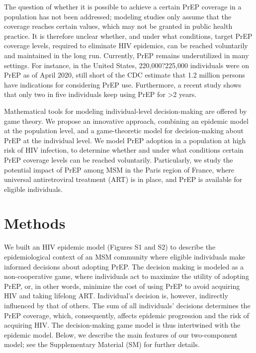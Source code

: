 \documentclass[preprint,review,12pt]{article}			%
\begin{document}
The question of whether it is possible to achieve a certain PrEP coverage in a population has not been addressed; modeling studies only assume that the coverage reaches certain values, which may not be granted in public health practice. It is therefore unclear whether, and under what conditions, target PrEP coverage levels, required to eliminate HIV epidemics, can be reached voluntarily and maintained in the long run. Currently, PrEP remains underutilized in many settings.\cite{Cohen2018} For instance, in the United States, 220,000?225,000 individuals were on PrEP as of April 2020,\cite{PrEPwatch_2019}  still short of the CDC estimate that 1.2 million persons have indications for considering PrEP use\cite{Smith2015}. Furthermore, a recent study shows that only two in five individuals keep using PrEP for >2 years.\cite{Coy2019} 

Mathematical tools for modeling individual-level decision-making are offered by game theory.\cite{Verelst2016,Manfredi2017,Chang2020} We propose an innovative approach, combining an epidemic model at the population level, and a game-theoretic model for decision-making about PrEP at the individual level. We model PrEP adoption in a population at high risk of HIV infection, to determine whether and under what conditions certain PrEP coverage levels can be reached voluntarily. Particularly, we study the potential impact of PrEP among MSM in the Paris region of France, where universal antiretroviral treatment (ART) is in place, and PrEP is available for eligible individuals. 


\section{Methods} \label{sec:Methods}

We built an HIV epidemic model (Figures S1 and S2) to describe the epidemiological context of an MSM community where eligible individuals make informed decisions about adopting PrEP. The decision making is modeled as a non-cooperative game, where individuals act to maximize the utility of adopting PrEP, or, in other words, minimize the cost of using PrEP to avoid acquiring HIV and taking lifelong ART. Individual's decision is, however, indirectly influenced by that of others. The sum of all individuals' decisions determines the PrEP coverage, which, consequently, affects epidemic progression and the risk of acquiring HIV. The decision-making game model is thus intertwined with the epidemic model. Below, we describe the main features of our two-component model; see the Supplementary Material (SM) for further details. 
\end{document}
